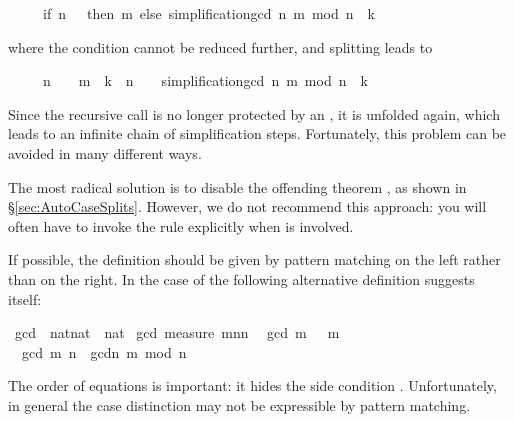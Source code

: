 \begin{isabellebody}
\begin{isamarkuptext}
\begin{isabelle}
\ \ \ \ \ {\isacharparenleft}if\ n\ {\isacharequal}\ {}\ then\ m\ else\ simplification{\isachardot}gcd\ {\isacharparenleft}n{\isacharcomma}\ m\ mod\ n{\isacharparenright}{\isacharparenright}\ {\isacharequal}\ k%
\end{isabelle}
where the condition cannot be reduced further, and splitting leads to
\begin{isabelle}%
\ \ \ \ \ {\isacharparenleft}n\ {\isacharequal}\ {}\ {\isasymlongrightarrow}\ m\ {\isacharequal}\ k{\isacharparenright}\ {\isasymand}\ {\isacharparenleft}n\ {\isasymnoteq}\ {}\ {\isasymlongrightarrow}\ simplification{\isachardot}gcd\ {\isacharparenleft}n{\isacharcomma}\ m\ mod\ n{\isacharparenright}\ {\isacharequal}\ k{\isacharparenright}%
\end{isabelle}
Since the recursive call  is no longer protected by
an , it is unfolded again, which leads to an infinite chain of
simplification steps. Fortunately, this problem can be avoided in many
different ways.

The most radical solution is to disable the offending theorem
,
as shown in \S\ref{sec:AutoCaseSplits}.  However, we do not recommend this
approach: you will often have to invoke the rule explicitly when
 is involved.

If possible, the definition should be given by pattern matching on the left
rather than  on the right. In the case of  the
following alternative definition suggests itself:%
\end{isamarkuptext}%
\isamarkuptrue%
\ gcd{}\ {\isacharcolon}{\isacharcolon}\ {\isachardoublequote}nat{\isasymtimes}nat\ {\isasymRightarrow}\ nat{\isachardoublequote}\isanewline
\isamarkupfalse%
\ gcd{}\ {\isachardoublequote}measure\ {\isacharparenleft}{\isasymlambda}{\isacharparenleft}m{\isacharcomma}n{\isacharparenright}{\isachardot}n{\isacharparenright}{\isachardoublequote}\isanewline
\ \ {\isachardoublequote}gcd{}\ {\isacharparenleft}m{\isacharcomma}\ {}{\isacharparenright}\ {\isacharequal}\ m{\isachardoublequote}\isanewline
\ \ {\isachardoublequote}gcd{}\ {\isacharparenleft}m{\isacharcomma}\ n{\isacharparenright}\ {\isacharequal}\ gcd{}{\isacharparenleft}n{\isacharcomma}\ m\ mod\ n{\isacharparenright}{\isachardoublequote}\isamarkupfalse%
%
\begin{isamarkuptext}%
\noindent
The order of equations is important: it hides the side condition
.  Unfortunately, in general the case distinction
may not be expressible by pattern matching.


\end{isamarkuptext}
\end{isabellebody}

